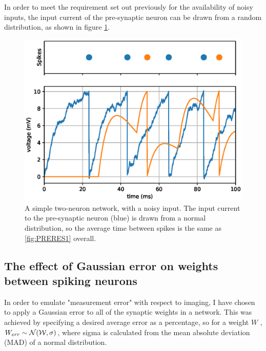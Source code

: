 In order to meet the requirement set out previously for the availability of
noisy inputs, the input current of the pre-synaptic neuron can be drawn from a
random distribution, as shown in figure \ref{fig:PRERES2}. 

\begin{figure}[h!]
    \centering
    \includegraphics[width=0.65\linewidth]{figures/graphs/twospikingneuronsdelaynoise.eps}
    \caption[A simple two-neuron network with noise]{A simple two-neuron network, with a noisy input. The input current to the pre-synaptic neuron (blue) is drawn from a normal distribution, so the average time between spikes is the same as \ref{fig:PRERES1} overall.}
    \label{fig:PRERES2}
\end{figure}
\FloatBarrier

\subsection{The effect of Gaussian error on weights between spiking neurons}

In order to emulate "measurement error" with respect to imaging, I have chosen
to apply a Gaussian error to all of the synaptic weights in a network. This was
achieved by specifying a desired average error as a percentage, so for a weight
$W$ , $W_{err} \sim \cal{N}(W,\sigma)$, where sigma is calculated from the mean
absolute deviation (MAD) of a normal distribution.

